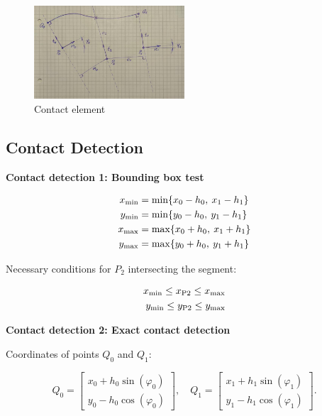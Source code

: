 \begin{figure}[h]
\centering
\includegraphics[width=0.5\textwidth]{figures/elements/contact_element_0}
\caption{Contact element}
\end{figure}

\subsection{Contact Detection}

\textbf{Contact detection 1: Bounding box test}

\begin{align*}
x_{\rm{min}} &= \min\{x_0 - h_0,\:x_1 - h_1\}\\
y_{\rm{min}} &= \min\{y_0 - h_0,\:y_1 - h_1\}\\
x_{\rm{max}} &= \max\{x_0 + h_0,\:x_1 + h_1\}\\
y_{\rm{max}} &= \max\{y_0 + h_0,\:y_1 + h_1\}
\end{align*}

Necessary conditions for $P_2$ intersecting the segment:

\begin{align*}
x_{\rm{min}} \le x_{\rm{P2}} \le x_{\rm{max}}\\
y_{\rm{min}} \le y_{\rm{P2}} \le y_{\rm{max}}
\end{align*}

\textbf{Contact detection 2: Exact contact detection}

Coordinates of points $Q_0$ and $Q_1$:

\begin{equation*}
Q_0 = \begin{bmatrix}
x_{0} + h_{0}\sin(\varphi_{0}) \\
y_{0} - h_{0}\cos(\varphi_{0})
\end{bmatrix},\quad
Q_1 = \begin{bmatrix}
x_{1} + h_{1}\sin(\varphi_{1}) \\
y_{1} - h_{1}\cos(\varphi_{1})
\end{bmatrix}.
\end{equation*}

